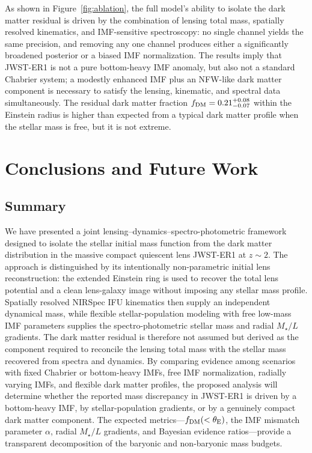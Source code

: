 \documentclass{article}
\begin{document}
As shown in Figure~\ref{fig:ablation}, the full model's ability to isolate the dark matter residual is driven by the combination of lensing total mass, spatially resolved kinematics, and IMF-sensitive spectroscopy: no single channel yields the same precision, and removing any one channel produces either a significantly broadened posterior or a biased IMF normalization. The results imply that JWST-ER1 is not a pure bottom-heavy IMF anomaly, but also not a standard Chabrier system; a modestly enhanced IMF plus an NFW-like dark matter component is necessary to satisfy the lensing, kinematic, and spectral data simultaneously. The residual dark matter fraction \(f_{\rm DM}=0.21^{+0.08}_{-0.07}\) within the Einstein radius is higher than expected from a typical dark matter profile when the stellar mass is free, but it is not extreme.

\section{Conclusions and Future Work}

\subsection*{Summary}
We have presented a joint lensing--dynamics--spectro-photometric framework designed to isolate the stellar initial mass function from the dark matter distribution in the massive compact quiescent lens JWST-ER1 at $z\sim2$. The approach is distinguished by its intentionally non-parametric initial lens reconstruction: the extended Einstein ring is used to recover the total lens potential and a clean lens-galaxy image without imposing any stellar mass profile. Spatially resolved NIRSpec IFU kinematics then supply an independent dynamical mass, while flexible stellar-population modeling with free low-mass IMF parameters supplies the spectro-photometric stellar mass and radial $M_\star/L$ gradients. The dark matter residual is therefore not assumed but derived as the component required to reconcile the lensing total mass with the stellar mass recovered from spectra and dynamics. By comparing evidence among scenarios with fixed Chabrier or bottom-heavy IMFs, free IMF normalization, radially varying IMFs, and flexible dark matter profiles, the proposed analysis will determine whether the reported mass discrepancy in JWST-ER1 is driven by a bottom-heavy IMF, by stellar-population gradients, or by a genuinely compact dark matter component. The expected metrics---$f_{\rm DM}(<\theta_{\rm E})$, the IMF mismatch parameter $\alpha$, radial $M_\star/L$ gradients, and Bayesian evidence ratios---provide a transparent decomposition of the baryonic and non-baryonic mass budgets.
\end{document}
